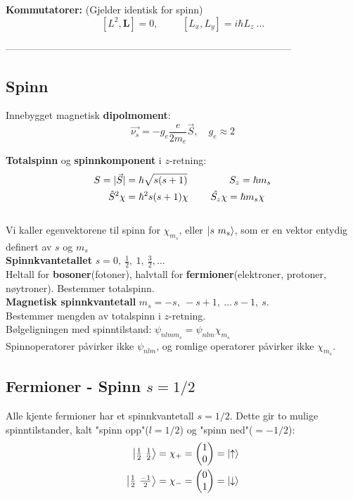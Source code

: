 \documentclass[10p,a4paper]{extarticle}
\begin{document}
\begin{multicols}{2}
\textbf{Kommutatorer:} (Gjelder identisk for spinn)
\[  [L^2, \textbf{L}] = 0, \hspace{1cm} [L_x, L_y] = i\hbar L_z\ \dots\]


---------------------------------------------------------------------------------------


\subsection*{Spinn}

Innebygget magnetisk \textbf{dipolmoment}:
\[ \vec{\nu_s} = -g_e\frac{e}{2m_e}\vec{S},\quad g_e \approx 2\]

\textbf{Totalspinn} og \textbf{spinnkomponent} i $z$-retning:
\begin{align*}
S = |\vec{S}| &= \hbar\sqrt{s(s+1)} \hspace{1.5cm} S_z = \hbar m_s \\
\hat{S}^2\chi &= \hbar^2s(s+1)\chi \hspace{0.8cm} \hat{S_z}\chi = \hbar m_s \chi
\end{align*}
\\
Vi kaller egenvektorene til spinn for $\chi_{m_s}$, eller $\ket{s\ m_s}$, som er en vektor entydig definert av $s$ og $m_s$
\\

\textbf{Spinnkvantetallet} $s = 0,\ \frac{1}{2},\ 1,\ \frac{3}{2},\dots$\\
Heltall for \textbf{bosoner}(fotoner), halvtall for \textbf{fermioner}(elektroner, protoner, nøytroner). Bestemmer totalspinn.
\\

\textbf{Magnetisk spinnkvantetall} $m_s = -s,\  -s+1,\ \dots \, s-1,\ s$.\\
Bestemmer mengden av totalspinn i $z$-retning.
\\

Bølgeligningen med spinntilstand: $\psi_{nlmm_s} = \psi_{nlm}\chi_{m_s}$
\\

Spinnoperatorer påvirker ikke $\psi_{nlm}$, og romlige operatorer påvirker ikke $\chi_{m_s}$.

\subsection*{Fermioner - Spinn $s = 1/2$}
Alle kjente fermioner har et spinnkvantetall $s = 1/2$. Dette gir to mulige spinntilstander, kalt "spinn opp"($l=1/2$) og "spinn ned"($=-1/2$):
\begin{align*}
\ket{\tfrac{1}{2}\ \tfrac{1}{2}} = \chi_+ = \begin{pmatrix} 1 \\ 0 \end{pmatrix} = \ket{\uparrow}\\
\ket{\tfrac{1}{2}\ \tfrac{-1}{2}} = \chi_- = \begin{pmatrix} 0 \\ 1 \end{pmatrix} = \ket{\downarrow}
\end{align*}


\end{multicols}
\end{document}
